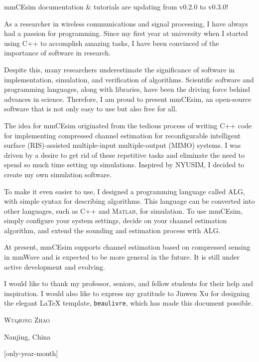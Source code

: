 \begin{tip}
  mmCEsim documentation \& tutorials are updating from v0.2.0 to v0.3.0!
\end{tip}

As a researcher in wireless communications and signal processing,
I have always had a passion for programming.
Since my first year at university
when I started using C++ to accomplish amazing tasks,
I have been convinced of the importance of software in research.

Despite this, many researchers underestimate the significance of software
in implementation, simulation, and verification of algorithms.
Scientific software and programming languages, along with libraries,
have been the driving force behind advances in science.
Therefore, I am proud to present mmCEsim,
an open-source software that is not only easy to use but also free for all.

The idea for mmCEsim originated from the tedious process of writing C++ code
for implementing compressed channel estimation for
reconfigurable intelligent surface (RIS)-assisted multiple-input multiple-output (MIMO) systems.
I was driven by a desire to get rid of these repetitive tasks and eliminate the need
to spend so much time setting up simulations.
Inspired by NYUSIM, I decided to create my own simulation software.

To make it even easier to use, I designed a programming language called ALG,
with simple syntax for describing algorithms.
This language can be converted into other languages, such as C++ and \textsc{Matlab}, for simulation.
To use mmCEsim, simply configure your system settings, decide on your channel estimation algorithm,
and extend the sounding and estimation process with ALG.

At present, mmCEsim supports channel estimation based on compressed sensing in mmWave
and is expected to be more general in the future.
It is still under active development and evolving.

I would like to thank my professor, seniors, and fellow students for their help and inspiration.
I would also like to express my gratitude to Jinwen Xu for designing the elegant \LaTeX{} template,
\texttt{beaulivre}, which has made this document possible.

\begin{flushright}
  \textsc{Wuqiong Zhao}

  Nanjing, China

  \TheDate{\the\year/\the\month}[only-year-month]
\end{flushright}
